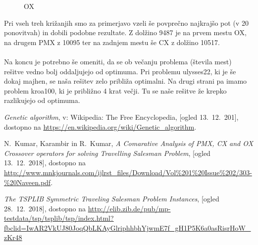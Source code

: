 \documentclass[12pt,a4paper]{amsart}
\theoremstyle{definition} %
\theoremstyle{plain} %
\begin{document}
\begin{figure}[h!]
\begin{minipage}[t]{0.48\textwidth}
\caption{OX}
\label{OX}
\end{minipage}
\end{figure}

Pri vseh treh križanjih smo za primerjavo vzeli še povprečno najkrajšo pot (v 20 ponovitvah) in dobili podobne rezultate. Z dolžino 9487 je na prvem mestu OX, na drugem PMX z 10095 ter na zadnjem mestu še CX z dolžino 10517.
\\
\\
Na koncu je potrebno še omeniti, da se ob večanju problema (števila mest) rešitve vedno bolj oddaljujejo od optimuma. Pri problemu ulysses22, ki je še dokaj majhen, se naša rešitev zelo približa optimalni. Na drugi strani pa imamo problem kroa100, ki je približno 4 krat večji. Tu se naše rešitve že krepko razlikujejo od optimuma. 


\newpage
\begin{thebibliography}{}


\emph{Genetic algorithm}, v: Wikipedia: The Free Encyclopedia, [ogled 13.~12.~201], dostopno na \url{https://en.wikipedia.org/wiki/Genetic_algorithm}.

N.~Kumar, Karambir in R.~Kumar, \emph{A Comarative Analysis of PMX, CX and OX Crossover operators for solving Travelling Salesman Problem}, [ogled 13.~12.~2018], dostopno na \url{http://www.mnkjournals.com/ijlrst_files/Download/Vol%201%20Issue%202/303-%20Naveen.pdf}.


 \emph{ The TSPLIB Symmetric Traveling Salesman Problem Instances}, [ogled 28.~12.~2018], dostopno na \url{http://elib.zib.de/pub/mp-testdata/tsp/tsplib/tsp/index.html?fbclid=IwAR2VkUJ80JoqQbLKAyGlriphhbhYjwmE7f_gH1P5K6a0asRisrHoW_zKr48}




\end{thebibliography}{}
\end{document}
